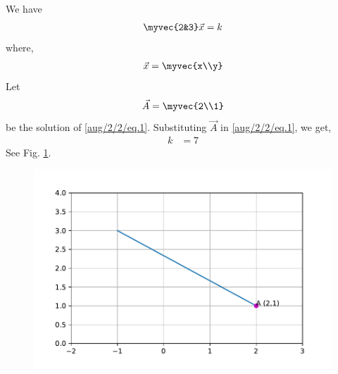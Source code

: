 
We have
\begin{align}
    \myvec{2&3}\vec{x}=k \label{aug/2/2/eq.1}
\end{align}
where,
\begin{align}
    \vec{x}=\myvec{x\\y}
\end{align}
Let \begin{align}
    \vec{A}=\myvec{2\\1}
\end{align}
be the solution of \eqref{aug/2/2/eq.1}.
Substituting $\vec{A}$ in \eqref{aug/2/2/eq.1}, we get,
\begin{align}
 k &=7
\end{align}
See Fig. \ref{aug/2/2/Fig1.1}.
\begin{figure}[h]
\centering
\includegraphics[width=\columnwidth]{solutions/aug/2/2/Figures/line.pdf}
\caption{}
\label{aug/2/2/Fig1.1}
\end{figure}
